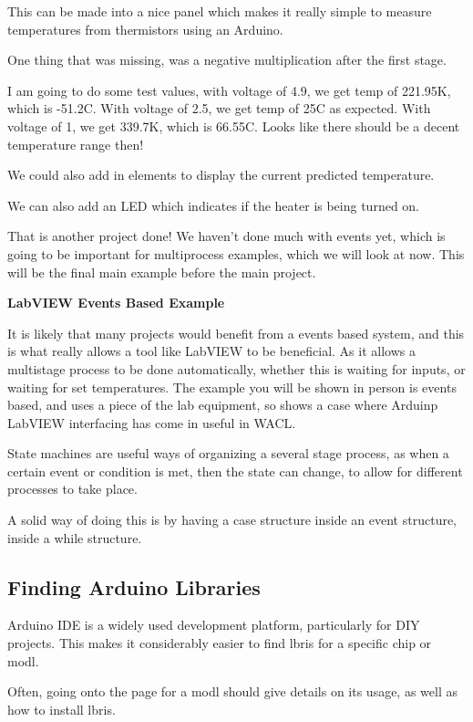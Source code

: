 \documentclass[a4paper,11pt]{report}
\begin{document}
This can be made into a nice panel which makes it really simple to measure temperatures from thermistors using an Arduino.

One thing that was missing, was a negative multiplication after the first stage.

I am going to do some test values, with voltage of 4.9, we get temp of 221.95K, which is -51.2C.
With voltage of 2.5, we get temp of 25C as expected.
With voltage of 1, we get 339.7K, which is 66.55C.
Looks like there should be a decent temperature range then!

We could also add in elements to display the current predicted temperature.

We can also add an LED which indicates if the heater is being turned on.


That is another project done! We haven't done much with events yet, which is going to be important for multiprocess examples, which we will look at now. This will be the final main example before the main project.

\textbf{LabVIEW Events Based Example}

It is likely that many projects would benefit from a events based system, and this is what really allows a tool like LabVIEW to be beneficial. As it allows a multistage process to be done automatically, whether this is waiting for inputs, or waiting for set temperatures. The example you will be shown in person is events based, and uses a piece of the lab equipment, so shows a case where Arduinp LabVIEW interfacing has come in useful in WACL.

State machines are useful ways of organizing a several stage process, as when a certain event or condition is met, then the state can change, to allow for different processes to take place.

A solid way of doing this is by having a case structure inside an event structure, inside a while structure.

\subsection{Finding Arduino Libraries}

Arduino IDE is a widely used development platform, particularly for DIY projects. This makes it considerably easier to find \gls{lbris} for a specific chip or \gls{modl}.

Often, going onto the page for a \gls{modl} should give details on its usage, as well as how to install \gls{lbris}.
\end{document}
